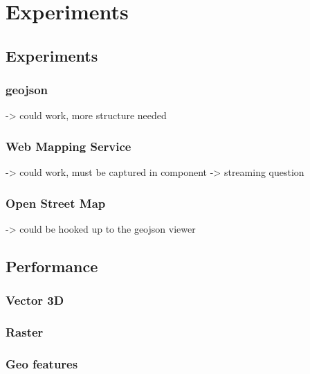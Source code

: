 \chapter{Experiments}%







\section{Experiments}

\subsection{ geojson }
-> could work, more structure needed

\subsection{ Web Mapping Service }
-> could work, must be captured in component
-> streaming question

\subsection{ Open Street Map }
-> could be hooked up to the geojson viewer



\section{ Performance }


\subsection{Vector 3D}

\subsection{Raster}

\subsection{Geo features}

